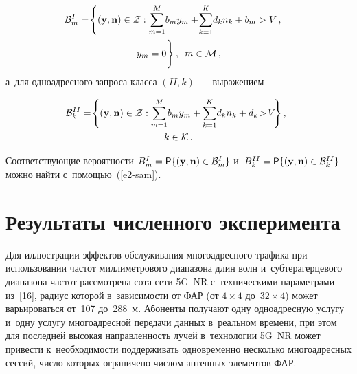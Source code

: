 \begin{multicols}{2}
\vspace*{-6pt}

\noindent
  \begin{multline*}
  \hspace*{-8pt}\mathcal{B}_m^I= \!\left\{ (\mathbf{y},\mathbf{n})\in\mathcal{Z} : 
\sum\limits^M_{m=1}\! b_my_m +\!\sum\limits^K_{k=1} \!d_k n_k+b_m > V\,,\right.\\  
\left.y_m=0
\vphantom{\sum\limits^M_{m=1}}
\right\},\enskip m\in \mathcal{M}\,,
  \end{multline*}
а~для одноадресного запроса класса $({II},k)$~--- выражением

\vspace*{-2pt}

\noindent
\begin{multline*}
\hspace*{-7pt}\mathcal{B}_k^{II} =\!\left\{ (\mathbf{y},\mathbf{n}) \in\mathcal{Z} : 
\sum\limits^M_{m=1} \!b_m y_m +\sum\limits^K_{k=1}\! d_k n_k +d_k 
\!>\!V\!\right\},\hspace*{-1.89pt}\\
 k\in\mathcal{K}\,.
\end{multline*}
  
  Соответствующие вероятности $B_m^I\hm= {\sf P}\{ (\mathbf{y}, 
\mathbf{n})\hm\in \mathcal{B}^I_m\}$ и~$B_k^{II} \hm= {\sf P}\{ 
(\mathbf{y},\mathbf{n})\hm\in \mathcal{B}_k^{II}\}$ можно найти  
с~по\-мощью~(\ref{e2-sam}).

\section{Результаты численного эксперимента}

\vspace*{-3pt}

  Для иллюстрации эффектов обслуживания многоадресного трафика при 
использовании час\-тот мил\-ли\-мет\-ро\-во\-го диапазона длин волн 
и~субтерагерцевого диапазона час\-тот рас\-смот\-ре\-на сота сети 5G~NR 
с~техническими па\-ра\-мет\-ра\-ми из~[16], радиус которой в~за\-ви\-си\-мости от ФАР 
(от $4\times4$ до~$32\times 4$) может варь\-и\-ро\-вать\-ся от~107 до~288~м. 
Абоненты получают одну одноадресную услугу и~одну услугу многоадресной 
передачи данных в~реальном времени, при этом для по\-след\-ней высокая 
на\-прав\-лен\-ность лучей в~технологии 5G~NR может привести к~не\-об\-хо\-ди\-мости 
поддерживать одновременно несколько многоадресных сессий, чис\-ло которых 
ограничено чис\-лом антенных элементов ФАР. 
  

\end{multicols}
